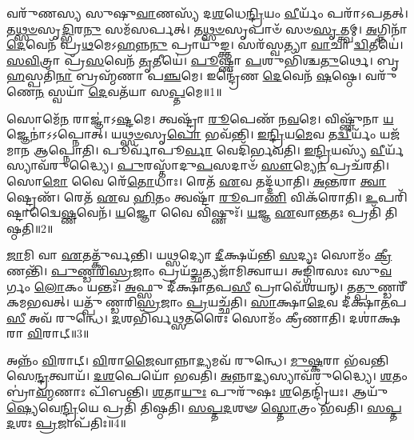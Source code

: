 \setcounter{anuvakam}{0}

𑌵𑌰𑍁᳴𑌣𑌸𑍍𑌯 𑌸𑍁𑌷𑍁\-\ul{𑌵𑌾}\-𑌣𑌸𑍍𑌯᳴ 𑌦\-\ul{𑌶}\-𑌧𑍇\-\ul{𑌨𑍍𑌦𑍍𑌰𑌿}\-𑌯𑌂 \ul{𑌵𑍀}\-𑌰𑍍𑌯𑌂᳴ 𑌪𑌰𑌾᳴\-𑌽𑌪𑌤𑌤𑍍।
𑌤\-\ul{𑌥𑍍𑌸}\-\-\ul{𑍞}\-𑌸𑍃\-\ul{𑌦𑍍𑌭𑌿}\-𑌰\-\ul{𑌨𑍁}\- 𑌸𑌮᳴𑌸𑌰𑍍𑌪𑌤𑍍।
𑌤\-\ul{𑌥𑍍𑌸}\-\-\ul{𑍞}\-𑌸𑍃𑌪𑌾𑍞᳴ 𑌸𑍞\-\ul{𑌸𑍃}\-𑌤𑍍𑌤𑍍𑌵𑌮𑍍।
\-\ul{𑌅}\-𑌗𑍍𑌨𑌿𑌨𑌾᳴ \ul{𑌦𑍇}\-𑌵𑍇𑌨᳴ 𑌪𑍍𑌰\-\ul{𑌥}\-𑌮𑍇\-𑌽\-\ul{𑌹}\-𑌨𑍍𑌨\-\ul{𑌨𑍁} 𑌪𑍍𑌰𑌾𑌯𑍁᳴𑌙𑍍𑌕𑍍𑌤।
𑌸𑌰᳴𑌸𑍍𑌵𑌤𑍍𑌯𑌾 \ul{𑌵𑌾}\-𑌚𑌾 \ul{𑌦𑍍𑌵𑌿}\-𑌤𑍀𑌯𑍇॑।
\-\ul{𑌸}\-\-\ul{𑌵𑌿}\-𑌤𑍍𑌰𑌾 𑌪𑍍𑌰᳴\-\ul{𑌸}\-𑌵𑍇𑌨᳴ \ul{𑌤𑍃}\-𑌤𑍀𑌯𑍇॑।
\-\ul{𑌪𑍂}\-𑌷𑍍𑌣𑌾 \ul{𑌪}\-𑌶𑍁𑌭𑌿᳴𑌶𑍍𑌚\-\ul{𑌤𑍁}\-𑌰𑍍𑌥𑍇।
𑌬𑍃\-\ul{𑌹}\-𑌸𑍍𑌪𑌤𑌿᳴\-\ul{𑌨𑌾} 𑌬𑍍𑌰𑌹𑍍𑌮᳴𑌣𑌾 𑌪\-\ul{𑌞𑍍𑌚}\-𑌮𑍇।
𑌇𑌨𑍍𑌦𑍍𑌰𑍇᳴𑌣 \ul{𑌦𑍇}\-𑌵𑍇𑌨᳴ \ul{𑌷}\-𑌷𑍍𑌠𑍇।
𑌵𑌰𑍁᳴𑌣𑍇\-\ul{𑌨} 𑌸𑍍𑌵𑌯𑌾᳴ \ul{𑌦𑍇}\-𑌵𑌤᳴𑌯𑌾 𑌸\-\ul{𑌪𑍍𑌤}\-𑌮𑍇॥1॥

𑌸𑍋𑌮𑍇᳴\-\ul{𑌨} 𑌰𑌾𑌜𑍍𑌞𑌾॑\-𑌽\-\ul{𑌷𑍍𑌟}\-𑌮𑍇।
𑌤𑍍𑌵𑌷𑍍𑌟𑍍𑌰𑌾᳴ \ul{𑌰𑍂}\-𑌪𑍇𑌣᳴ 𑌨\-\ul{𑌵}\-𑌮𑍇।
𑌵𑌿𑌷𑍍𑌣𑍁᳴𑌨𑌾 \ul{𑌯}\-𑌜𑍍𑌞𑍇𑌨𑌾॑𑌽𑌽𑌪𑍍𑌨𑍋𑌤𑍍।
𑌯\-\ul{𑌥𑍍𑌸}\-\-\ul{𑍞}\-𑌸𑍃\-\ul{𑌪𑍋} 𑌭𑌵᳴𑌨𑍍𑌤𑌿।
\-\ul{𑌇}\-\-\ul{𑌨𑍍𑌦𑍍𑌰𑌿}\-𑌯\-\ul{𑌮𑍇}\-𑌵 𑌤\-\ul{𑌦𑍍𑌵𑍀}\-𑌰𑍍𑌯𑌂᳴ 𑌯𑌜᳴𑌮𑌾𑌨 𑌆𑌪𑍍𑌨𑍋𑌤𑌿।
𑌪𑍂𑌰𑍍𑌵𑌾᳴𑌪𑍂\-\ul{𑌰𑍍𑌵𑌾} 𑌵𑍇𑌦𑌿᳴𑌰𑍍𑌭𑌵𑌤𑌿।
\-\ul{𑌇}\-\-\ul{𑌨𑍍𑌦𑍍𑌰𑌿}\-𑌯𑌸𑍍𑌯᳴ \ul{𑌵𑍀}\-𑌰𑍍𑌯᳴𑌸𑍍𑌯𑌾𑌵᳴𑌰𑍁𑌦𑍍𑌧𑍍𑌯𑍈।
\-\ul{𑌪𑍁}\-𑌰𑌸𑍍𑌤𑌾᳴𑌦𑍁\-\ul{𑌪}\-𑌸𑌦𑌾𑍞᳴ \ul{𑌸𑍗}\-𑌮𑍍𑌯𑍇\-\ul{𑌨} 𑌪𑍍𑌰𑌚᳴𑌰𑌤𑌿।
𑌸𑍋\-\ul{𑌮𑍋} 𑌵𑍈 𑌰𑍇᳴\-\ul{𑌤𑍋}\-𑌧𑌾𑌃।
𑌰𑍇𑌤᳴ \ul{𑌏}\-𑌵 𑌤𑌦𑍍𑌦᳴𑌧𑌾𑌤𑌿।
\-\ul{𑌅}\-\-\ul{𑌨𑍍𑌤}\-𑌰𑌾 \ul{𑌤𑍍𑌵𑌾}\-𑌷𑍍𑌟𑍍𑌰𑍇𑌣᳴।
𑌰𑍇𑌤᳴ \ul{𑌏}\-𑌵 \ul{𑌹𑌿}\-𑌤𑌂 𑌤𑍍𑌵𑌷𑍍𑌟𑌾᳴ \ul{𑌰𑍂}\-𑌪𑌾\-\ul{𑌣𑌿} 𑌵𑌿𑌕᳴𑌰𑍋𑌤𑌿।
\-\ul{𑌉}\-𑌪𑌰𑌿᳴𑌷𑍍𑌟𑌾𑌦𑍍𑌵𑍈\-\ul{𑌷𑍍𑌣}\-𑌵𑍇𑌨᳴।
\-\ul{𑌯}\-𑌜𑍍𑌞𑍋 𑌵𑍈 𑌵𑌿𑌷𑍍𑌣𑍁𑌃᳴।
\-\ul{𑌯}\-𑌜𑍍𑌞 \ul{𑌏}\-𑌵𑌾\-\ul{𑌨𑍍𑌤}\-𑌤𑌃 𑌪𑍍𑌰𑌤𑌿᳴ 𑌤𑌿𑌷𑍍𑌠𑌤𑌿॥2॥\anuvakamend[\-\ul{𑌸}\-\-\ul{𑌪𑍍𑌤}\-𑌮𑍇 𑌦᳴𑌧𑌾\-\ul{𑌤𑌿} 𑌪𑌞𑍍𑌚᳴ 𑌚]

\-\ul{𑌜𑌾}\-𑌮𑌿 𑌵𑌾 \ul{𑌏}\-𑌤𑌤𑍍𑌕𑍁᳴𑌰𑍍𑌵𑌨𑍍𑌤𑌿।
𑌯\-\ul{𑌥𑍍𑌸}\-𑌦𑍍𑌯𑍋 \ul{𑌦𑍀}\-𑌕𑍍𑌷𑌯᳴𑌨𑍍𑌤𑌿 \ul{𑌸}\-𑌦𑍍𑌯𑌃 𑌸𑍋𑌮𑌂᳴ \ul{𑌕𑍍𑌰𑍀}\-𑌣𑌨𑍍𑌤𑌿᳴।
\-\ul{𑌪𑍁}\-\-\ul{𑌣𑍍𑌡}\-\-\ul{𑌰𑌿}\-\-\ul{𑌸𑍍𑌰}\-𑌜𑌾𑌂 𑌪𑍍𑌰𑌯᳴\-\ul{𑌚𑍍𑌛}\-𑌤𑍍𑌯𑌜𑌾᳴𑌮𑌿𑌤𑍍𑌵𑌾𑌯।
𑌅𑌙𑍍𑌗𑌿᳴𑌰𑌸𑌃 𑌸𑍁\-\ul{𑌵}\-𑌰𑍍𑌗𑌂 \ul{𑌲𑍋}\-𑌕𑌂 𑌯𑌨𑍍𑌤𑌃᳴।
\-\ul{𑌅}\-𑌫𑍍𑌸𑍁 𑌦𑍀॑𑌕𑍍𑌷𑌾\-\ul{𑌤}\-𑌪\-\ul{𑌸𑍀} 𑌪𑍍𑌰𑌾𑌵𑍇᳴𑌶𑌯𑌨𑍍।
𑌤\-\ul{𑌤𑍍𑌪𑍁}\-𑌣𑍍𑌡𑌰𑍀᳴𑌕𑌮𑌭𑌵𑌤𑍍।
𑌯𑌤𑍍𑌪𑍁᳴𑌣𑍍𑌡𑌰𑌿\-\ul{𑌸𑍍𑌰}\-𑌜𑌾𑌂 \ul{𑌪𑍍𑌰}\-𑌯𑌚𑍍𑌛᳴𑌤𑌿।
\-\ul{𑌸𑌾}\-𑌕𑍍𑌷𑌾\-\ul{𑌦𑍇}\-𑌵 𑌦𑍀॑𑌕𑍍𑌷𑌾\-\ul{𑌤}\-𑌪\-\ul{𑌸𑍀} 𑌅𑌵᳴ 𑌰𑍁𑌨𑍍𑌧𑍇।
\-\ul{𑌦}\-𑌶𑌭𑌿᳴𑌰𑍍𑌵𑌥𑍍𑌸\-\ul{𑌤}\-𑌰𑍈𑌃 𑌸𑍋𑌮𑌂᳴ 𑌕𑍍𑌰𑍀𑌣𑌾𑌤𑌿।
𑌦𑌶𑌾॑𑌕𑍍𑌷𑌰𑌾 \ul{𑌵𑌿}\-𑌰𑌾𑌟𑍍॥3॥

𑌅𑌨𑍍𑌨𑌂᳴ \ul{𑌵𑌿}\-𑌰𑌾𑌟𑍍।
\-\ul{𑌵𑌿}\-𑌰𑌾\-\ul{𑌜𑍈}\-𑌵𑌾𑌨𑍍𑌨𑌾\-\ul{𑌦𑍍𑌯}\-𑌮𑌵᳴ 𑌰𑍁𑌨𑍍𑌧𑍇।
\-\ul{𑌮𑍁}\-\-\ul{𑌷𑍍𑌕}\-𑌰𑌾 𑌭᳴𑌵𑌨𑍍𑌤𑌿 𑌸𑍇\-\ul{𑌨𑍍𑌦𑍍𑌰}\-𑌤𑍍𑌵𑌾𑌯᳴।
\-\ul{𑌦}\-\-\ul{𑌶}\-𑌪𑍇𑌯𑍋᳴ 𑌭𑌵𑌤𑌿।
\-\ul{𑌅}\-𑌨𑍍𑌨𑌾\-\ul{𑌦𑍍𑌯}\-𑌸𑍍𑌯𑌾𑌵᳴𑌰𑍁𑌦𑍍𑌧𑍍𑌯𑍈।
\-\ul{𑌶}\-𑌤𑌂 𑌬𑍍𑌰𑌾॑\-\ul{𑌹𑍍𑌮}\-𑌣𑌾𑌃 𑌪𑌿᳴𑌬𑌨𑍍𑌤𑌿।
\-\ul{𑌶}\-𑌤𑌾\-\ul{𑌯𑍁𑌃} 𑌪𑍁𑌰𑍁᳴𑌷𑌃 \ul{𑌶}\-𑌤𑍇𑌨𑍍𑌦𑍍𑌰𑌿᳴𑌯𑌃।
𑌆𑌯𑍁᳴\-\ul{𑌷𑍍𑌯𑍇}\-𑌵𑍇\-\ul{𑌨𑍍𑌦𑍍𑌰𑌿}\-𑌯𑍇 𑌪𑍍𑌰𑌤𑌿᳴ 𑌤𑌿𑌷𑍍𑌠𑌤𑌿।
\-\ul{𑌸}\-\-\ul{𑌪𑍍𑌤}\-\-\ul{𑌦}\-𑌶𑍟 \ul{𑌸𑍍𑌤𑍋}\-𑌤𑍍𑌰𑌂 𑌭᳴𑌵𑌤𑌿।
\-\ul{𑌸}\-\-\ul{𑌪𑍍𑌤}\-\-\ul{𑌦}\-𑌶𑌃 \ul{𑌪𑍍𑌰}\-𑌜𑌾\-𑌪᳴𑌤𑌿𑌃॥4॥

